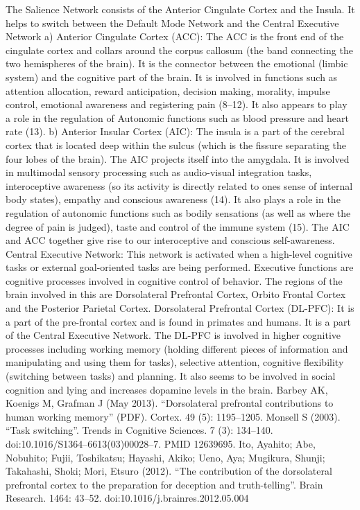 \documentclass[twocolumn]{article}
\begin{document}
The Salience Network consists of the Anterior Cingulate Cortex and the Insula. It helps to switch between the Default Mode Network and the Central Executive Network
a) Anterior Cingulate Cortex (ACC): The ACC is the front end of the cingulate cortex and collars around the corpus callosum (the band connecting the two hemispheres of the brain). It is the connector between the emotional (limbic system) and the cognitive part of the brain. It is involved in functions such as attention allocation, reward anticipation, decision making, morality, impulse control, emotional awareness and registering pain (8–12). It also appears to play a role in the regulation of Autonomic functions such as blood pressure and heart rate (13).
b) Anterior Insular Cortex (AIC): The insula is a part of the cerebral cortex that is located deep within the sulcus (which is the fissure separating the four lobes of the brain). The AIC projects itself into the amygdala. It is involved in multimodal sensory processing such as audio-visual integration tasks, interoceptive awareness (so its activity is directly related to ones sense of internal body states), empathy and conscious awareness (14). It also plays a role in the regulation of autonomic functions such as bodily sensations (as well as where the degree of pain is judged), taste and control of the immune system (15).
The AIC and ACC together give rise to our interoceptive and conscious self-awareness.
Central Executive Network:
This network is activated when a high-level cognitive tasks or external goal-oriented tasks are being performed. Executive functions are cognitive processes involved in cognitive control of behavior.
The regions of the brain involved in this are Dorsolateral Prefrontal Cortex, Orbito Frontal Cortex and the Posterior Parietal Cortex.
Dorsolateral Prefrontal Cortex (DL-PFC): It is a part of the pre-frontal cortex and is found in primates and humans. It is a part of the Central Executive Network. The DL-PFC is involved in higher cognitive processes including working memory (holding different pieces of information and manipulating and using them for tasks), selective attention, cognitive flexibility (switching between tasks) and planning. It also seems to be involved in social cognition and lying and increases dopamine levels in the brain.
Barbey AK, Koenigs M, Grafman J (May 2013). “Dorsolateral prefrontal contributions to human working memory” (PDF). Cortex. 49 (5): 1195–1205.
Monsell S (2003). “Task switching”. Trends in Cognitive Sciences. 7 (3): 134–140. doi:10.1016/S1364–6613(03)00028–7. PMID 12639695.
Ito, Ayahito; Abe, Nobuhito; Fujii, Toshikatsu; Hayashi, Akiko; Ueno, Aya; Mugikura, Shunji; Takahashi, Shoki; Mori, Etsuro (2012). “The contribution of the dorsolateral prefrontal cortex to the preparation for deception and truth-telling”. Brain Research. 1464: 43–52. doi:10.1016/j.brainres.2012.05.004
\end{document}
